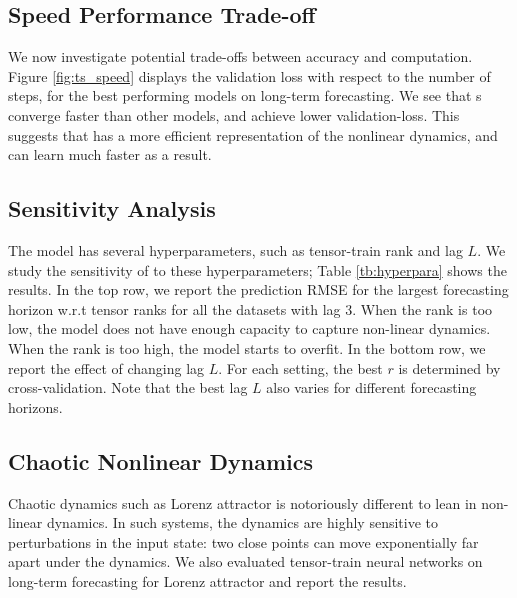 \subsection{Speed Performance Trade-off}
 We now investigate potential trade-offs between accuracy and computation.
 Figure \ref{fig:ts_speed} displays the validation loss with respect to the number of steps, for the best performing models on long-term forecasting. We see that \trnn{}s converge faster than other models, and achieve lower validation-loss.
 This suggests that \trnn{} has a more efficient representation of the nonlinear dynamics, and can learn much faster as a result.






\subsection{Sensitivity Analysis}
% 
The \tlstm{} model has several hyperparameters, such as tensor-train rank and lag $L$. 
% 
We study the sensitivity of \tlstm{} to these hyperparameters; Table \ref{tb:hyperpara} shows the results. 
% 
In the top row, we report the prediction RMSE for the largest forecasting horizon  w.r.t tensor ranks for all the datasets with lag $3$. 
% 
When the rank is too low, the model does not have enough capacity to capture non-linear dynamics. 
% 
When the rank is too high, the model starts to overfit. 
% 
In the bottom row, we report the effect of changing lag $L$. For each setting, the best $r$ is determined by cross-validation. 
% 
Note that the best lag $L$ also varies for different forecasting horizons.
% 



\subsection{Chaotic Nonlinear Dynamics}

Chaotic dynamics such as Lorenz attractor is notoriously different to lean in non-linear dynamics. In such systems, the dynamics are highly sensitive to perturbations in the input state: two close points can move exponentially far apart under the dynamics.  We  also evaluated tensor-train neural networks on long-term forecasting for Lorenz attractor and report the results.

%
